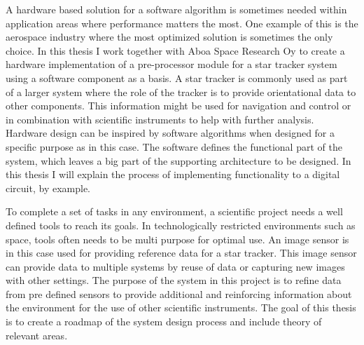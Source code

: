 \documentclass[12pt]{report}
\begin{document}
A hardware based solution for a software algorithm is sometimes needed within application areas where performance matters the most. One example of this is the aerospace industry where the most optimized solution is sometimes the only choice. In this thesis I work together with Aboa Space Research Oy to create a hardware implementation of a pre-processor module for a star tracker system using a software component as a basis. A star tracker is commonly used as part of a larger system where the role of the tracker is to provide orientational data to other components. This information might be used for navigation and control or in combination with scientific instruments to help with further analysis.
Hardware design can be inspired by software algorithms when designed for a specific purpose as in this case. The software defines the functional part of the system, which leaves a big part of the supporting architecture to be designed. In this thesis I will explain the process of implementing functionality to a digital circuit, by example.



\par

To complete a set of tasks in any environment, a scientific project needs a well defined tools to reach its goals. In technologically restricted environments such as space, tools often needs to be multi purpose for optimal use. An image sensor is in this case used for providing reference data for a star tracker. This image sensor can provide data to multiple systems by reuse of data or capturing new images with other settings. The purpose of the system in this project is to refine data from pre defined sensors to provide additional and reinforcing information about the environment for the use of other scientific instruments. The goal of this thesis is to create a roadmap of the system design process and include theory of relevant areas.
\end{document}

